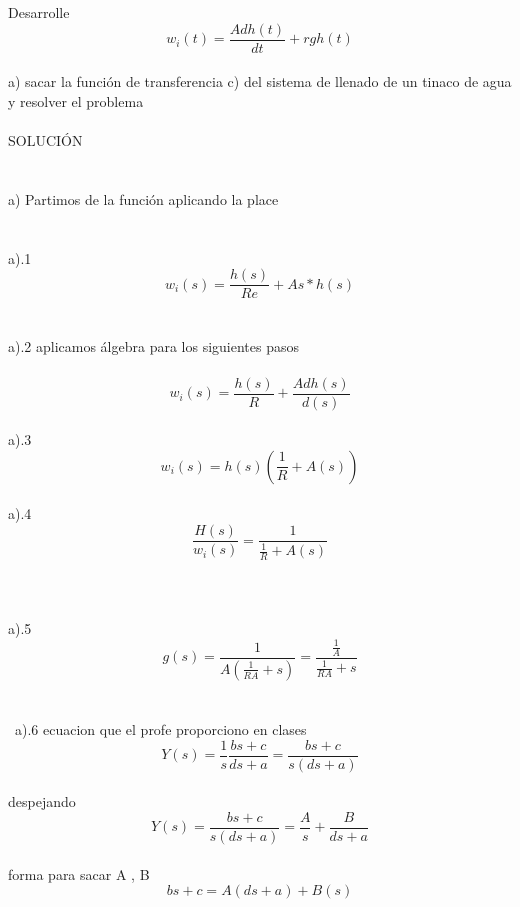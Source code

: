\documentclass[12pt]{article}
\begin{document}
Desarrolle
\begin{equation}
w_i(t)=\frac{Adh(t)}{dt}+rgh(t)
\end{equation}
\\a) sacar la función de transferencia c) del sistema de llenado de un tinaco de agua y resolver el problema 
\\ \\
SOLUCIÓN
\\\\\\a) Partimos de la función aplicando la place
\\\\\\a).1\begin{equation}
w_i(s)=\frac{h(s)}{Re}+As*h(s)
\end{equation}
\\\\a).2 aplicamos álgebra para los siguientes pasos\\\\
\begin{equation}
w_i(s)=\frac{h(s)}{R}+\frac{Adh(s)}{d(s)}
\end{equation}
\\ a).3 \begin{equation}
w_i(s)=h(s)(\frac{1}{R}+A(s))
\end{equation}
\\ a).4 \begin{equation}
\frac{H(s)}{w_i(s)}=\frac{1}{\frac{1}{R}+A(s)}
\end{equation}
\\
\\
\\ a).5 \begin{equation}
g(s)=\frac{1}{A(\frac{1}{RA}+s)}=\frac{\frac{1}{A}}{\frac{1}{RA}+s}
\end{equation} 
\\\
\\\ a).6 ecuacion que el profe proporciono en clases   
\begin{equation}
  Y(s)=\frac{1}{s}\frac{bs+c}{ds +a}=\frac{bs+c}{s(ds+a)}
\end{equation} 
\\ despejando  \begin{equation}
Y(s)=\frac{bs+c}{s(ds+a)}=\frac{A}{s}+\frac{B}{ds+a}
\end{equation}
\\ forma para sacar A , B \begin{equation}
bs+c = A(ds+a)+B(s)
\end{equation}
\end{document}
